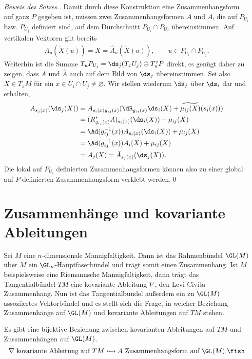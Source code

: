 \documentclass[%
	paper=a5,%
	fleqn,%
	DIV=18,%
	BCOR=0mm,
	fontsize=11pt,
	titlepage=false,%
	bibliography=totoc,
	DIV=18,%
	twoside=true,
	pdftitle=Riemannsche Geometrie,
	pdfauthor=Uwe Semmelmann,
	numbers=noendperiod]%
	{scrbook}
\begin{document}
\begin{proof}[Beweis des Satzes.]
Damit durch diese
Konstruktion eine Zusammenhangsform auf ganz $P$ gegeben ist, müssen zwei
Zusammenhangsformen $A$ und $\hat{A}$, die auf $P_{U_i}$ bzw. $P_{U_j}$ definiert sind,
auf dem Durchschnitt $P_{U_i}\cap P_{U_j}$ übereinstimmen.
Auf vertikalen Vektoren gilt bereits
\begin{align*}
A_u(\tilde{X}(u)) = X = \hat{A}_u(\tilde{X}(u)),\qquad u\in P_{U_i}\cap P_{U_j}.
\end{align*}
Weiterhin ist die Summe $T_uP_{U_j} = \ds_j(T_xU_j)\oplus T^v_uP$ direkt, es
genügt daher zu zeigen, dass $A$ und $\hat{A}$ auch auf dem Bild von $\ds_j$
übereinstimmen. Sei also $X\in T_xM$ für ein $x\in U_i\cap U_j\neq \varnothing$. Wir stellen wiederum $\ds_j$ über $\ds_i$ dar und erhalten,
\begin{align*}
A_{s_j(x)}(\ds_j(X)) &= 
{A}_{s_i(x)g_{ij}(x)}(\dR_{g_{ij}(x)}\ds_i(X) + \widetilde{\mu_{ij}(X)}(s_i(x))) \\
&=
(R_{g_{ij}(x)}^*{A})_{s_i(x)}(\ds_i(X)) + \mu_{ij}(X)\\
&=
\Ad(g_{ij}^{-1}(x)){A}_{s_i(x)}(\ds_i(X)) + \mu_{ij}(X)\\
&=
\Ad(g_{ij}^{-1}(x))A_i(X) + \mu_{ij}(X)\\
&=A_j(X) = \hat{A}_{s_j(x)}(\ds_j(X)).
\end{align*}
Die lokal auf $P_{U_i}$ definierten Zusammenhangsformen können also zu einer
global auf $P$ definierten Zusammenhangsform verklebt werden.\qed
\end{proof}


\section{Zusammenhänge und kovariante Ableitungen}

Sei $M$ eine $n$-dimensionale Mannigfaltigkeit. Dann ist das Rahmenbündel
$\GL(M)$ über $M$ ein $\GL_n$-Hauptfaserbündel und trägt somit einen
Zusammenhang. Ist $M$ beispielsweise eine Riemannsche Mannigfaltigkeit, dann
trägt das Tangentialbündel $TM$ eine kovariante Ableitung $\nabla$, den
Levi-Civita-Zusammenhang. Nun ist das Tangentialbündel außerdem ein zu $\GL(M)$
assoziiertes Vektorbündel und es stellt sich die Frage, in welcher Beziehung
Zusammenhänge auf $\GL(M)$ und kovariante Ableitungen auf $TM$ stehen. 


\begin{prop}
Es gibt eine bijektive Beziehung zwischen kovarianten Ableitungen auf $TM$ und
Zusammenhängen auf $\GL(M)$.
\begin{align*}
\nabla\text{ kovariante Ableitung auf }TM \leftrightsquigarrow A \text{
Zusammenhangsform auf }\GL(M).\fish
\end{align*}
\end{prop}
\end{document}
